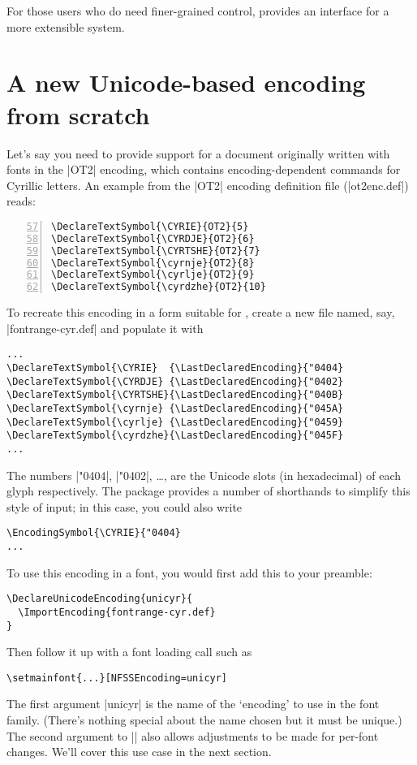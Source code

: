 \documentclass[a4paper]{ltxdoc}
\begin{document}
For those users who do need finer-grained control,  provides an
interface for a more extensible system.


\section{A new Unicode-based encoding from scratch}

Let's say you need to provide support for a document originally written with fonts
in the |OT2| encoding, which contains encoding-dependent commands for Cyrillic letters.
An example from the |OT2| encoding definition file (|ot2enc.def|) reads:
\begin{Verbatim}[numbers=left,firstnumber=57]
\DeclareTextSymbol{\CYRIE}{OT2}{5}
\DeclareTextSymbol{\CYRDJE}{OT2}{6}
\DeclareTextSymbol{\CYRTSHE}{OT2}{7}
\DeclareTextSymbol{\cyrnje}{OT2}{8}
\DeclareTextSymbol{\cyrlje}{OT2}{9}
\DeclareTextSymbol{\cyrdzhe}{OT2}{10}
\end{Verbatim}

To recreate this encoding in a form suitable for , create a new file
named, say, |fontrange-cyr.def| and populate it with
\begin{Verbatim}
...
\DeclareTextSymbol{\CYRIE}  {\LastDeclaredEncoding}{"0404}
\DeclareTextSymbol{\CYRDJE} {\LastDeclaredEncoding}{"0402}
\DeclareTextSymbol{\CYRTSHE}{\LastDeclaredEncoding}{"040B}
\DeclareTextSymbol{\cyrnje} {\LastDeclaredEncoding}{"045A}
\DeclareTextSymbol{\cyrlje} {\LastDeclaredEncoding}{"0459}
\DeclareTextSymbol{\cyrdzhe}{\LastDeclaredEncoding}{"045F}
...
\end{Verbatim}
The numbers |"0404|, |"0402|, \dots, are the Unicode slots (in hexadecimal)
of each glyph respectively.
The  package provides a number of shorthands to simplify this style of input; in this case,
you could also write
\begin{Verbatim}
\EncodingSymbol{\CYRIE}{"0404}
...
\end{Verbatim}

To use this encoding in a  font, you would first add this to your preamble:
\begin{Verbatim}
\DeclareUnicodeEncoding{unicyr}{
  \ImportEncoding{fontrange-cyr.def}
}
\end{Verbatim}
Then follow it up with a font loading call such as
\begin{Verbatim}
\setmainfont{...}[NFSSEncoding=unicyr]
\end{Verbatim}
The first argument |unicyr| is the name of the `encoding' to use in the
font family. (There's nothing special about the name chosen but it must be unique.)
The second argument to |\DeclareUnicodeEncoding| also allows adjustments to be made
for per-font changes.
We'll cover this use case in the next section.
\end{document}
